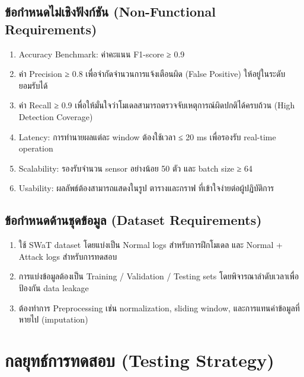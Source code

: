 \subsection{ข้อกำหนดไม่เชิงฟังก์ชัน (Non-Functional Requirements)}
\begin{enumerate}
    \item Accuracy Benchmark: ค่าคะแนน F1-score ≥ 0.9 
    \item ค่า Precision ≥ 0.8 เพื่อจำกัดจำนวนการแจ้งเตือนผิด (False Positive) ให้อยู่ในระดับยอมรับได้
    \item ค่า Recall ≥ 0.9 เพื่อให้มั่นใจว่าโมเดลสามารถตรวจจับเหตุการณ์ผิดปกติได้ครบถ้วน (High Detection Coverage)
    \item Latency: การทำนายผลแต่ละ window ต้องใช้เวลา ≤ 20 ms เพื่อรองรับ real-time operation
    \item Scalability: รองรับจำนวน sensor อย่างน้อย 50 ตัว และ batch size ≥ 64
    \item Usability: ผลลัพธ์ต้องสามารถแสดงในรูป ตารางและกราฟ ที่เข้าใจง่ายต่อผู้ปฏิบัติการ
\end{enumerate}

\subsection{ข้อกำหนดด้านชุดข้อมูล (Dataset Requirements)}
\begin{enumerate}
    \item ใช้ SWaT dataset โดยแบ่งเป็น Normal logs สำหรับการฝึกโมเดล และ Normal + Attack logs สำหรับการทดสอบ
    \item การแบ่งข้อมูลต้องเป็น Training / Validation / Testing sets โดยพิจารณาลำดับเวลาเพื่อป้องกัน data leakage
    \item ต้องทำการ Preprocessing เช่น normalization, sliding window, และการแทนค่าข้อมูลที่หายไป (imputation)
\end{enumerate}

\section{กลยุทธ์การทดสอบ (Testing Strategy)}
